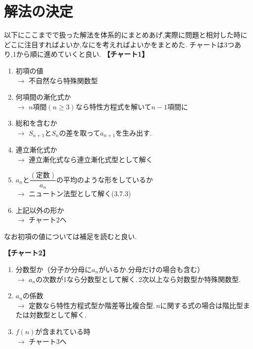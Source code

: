 
  \section{解法の決定}
    以下にここまでで扱った解法を体系的にまとめあげ,実際に問題と相対した時にどこに注目すればよいか,なにを考えればよいかをまとめた.
    チャートは3つあり,1から順に進めていくと良い.
    \noindent \textbf{【チャート1】}
    \begin{enumerate}
      \item 初項の値\\
            $\rightarrow$ 不自然なら特殊関数型
      \item 何項間の漸化式か\\
            $\rightarrow$ $n$項間$(n\ge3)$なら特性方程式を解いて$n-1$項間に
      \item 総和を含むか\\
            $\rightarrow$ $S_{n+1}$と$S_n$の差を取って$a_{n+1}$を生み出す.
      \item 連立漸化式か\\
            $\rightarrow$ 連立漸化式なら連立漸化式型として解く
      \item $a_n$と$\dfrac{(\text{定数})}{a_n}$の平均のような形をしているか\\
            $\rightarrow$ ニュートン法型として解く(3.7.3)
      \item 上記以外の形か\\
            $\rightarrow$ チャート2へ
    \end{enumerate}
    なお初項の値については補足を読むと良い.

    \noindent \textbf{【チャート2】}
    \begin{enumerate}
        \item 分数型か（分子か分母に$a_n$がいるか.分母だけの場合も含む）\\
              $\rightarrow$ $a_n$の次数が1なら分数型として解く.\,2次以上なら対数型か特殊関数型.
        \item $a_n$の係数\\
              $\rightarrow$ 定数なら特性方程式型か階差等比複合型.\,$n$に関する式の場合は階比型または対数型として解く.
        \item $f(n)$が含まれている時\\
              $\rightarrow$ チャート3へ
    \end{enumerate}

